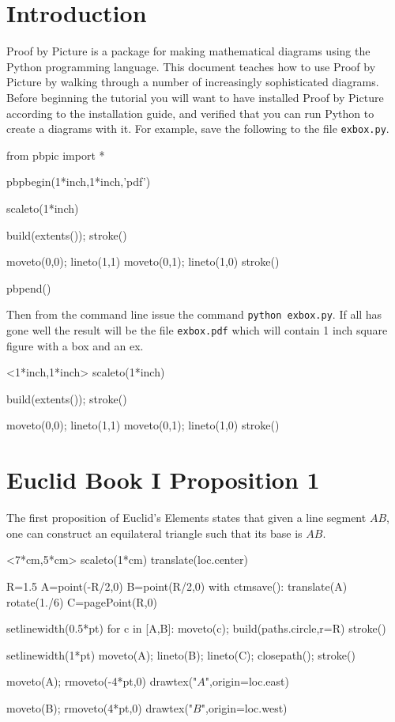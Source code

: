 \documentclass[12pt]{article}
\def\file#1{{\tt #1}}
\begin{document}
\section{Introduction}
Proof by Picture is a package for making mathematical diagrams
using the Python programming language.  This document teaches how to use 
Proof by Picture by walking through a number of
increasingly sophisticated diagrams.  Before beginning
the tutorial you will want to have installed Proof by Picture according to
the installation guide, and verified that you can run Python to
create a diagrams with it. For example, save the following to the file \file{exbox.py}.

\begin{snippet}
from pbpic import *

pbpbegin(1*inch,1*inch,'pdf')

scaleto(1*inch)

build(extents()); stroke()

moveto(0,0); lineto(1,1)
moveto(0,1); lineto(1,0)
stroke()

pbpend()
\end{snippet}

Then from the command line issue the command \file{python exbox.py}.
If all has gone well the result will be the file \file{exbox.pdf}
which will contain 1 inch square figure with a box and an ex.

\par\vskip12pt  \hfil\begin{pbpic}<1*inch,1*inch>
scaleto(1*inch)

build(extents()); stroke()

moveto(0,0); lineto(1,1)
moveto(0,1); lineto(1,0)
stroke()  
\end{pbpic}

\section{Euclid Book I Proposition 1}
The first proposition of Euclid's Elements states that 
given a line segment $AB$, one can
construct an equilateral triangle such that
its base is $AB$.

\hfil\begin{pbpic}<7*cm,5*cm>
scaleto(1*cm)
translate(loc.center)

R=1.5
A=point(-R/2,0)
B=point(R/2,0)
with ctmsave():
  translate(A)
  rotate(1./6)
  C=pagePoint(R,0)

setlinewidth(0.5*pt)
for c in [A,B]:
  moveto(c); build(paths.circle,r=R)
  stroke()

setlinewidth(1*pt)
moveto(A); lineto(B); lineto(C); closepath();
stroke()

moveto(A); rmoveto(-4*pt,0)
drawtex("$A$",origin=loc.east)

moveto(B); rmoveto(4*pt,0)
drawtex("$B$",origin=loc.west)
\end{pbpic}
\end{document}
